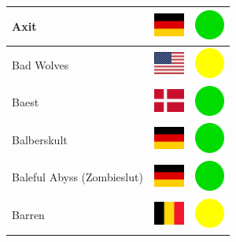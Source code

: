 \documentclass[12pt, a4paper, twoside]{report}
\begin{document}
\begin{center}
\begin{longtable}{|p{5cm}|p{2cm}|p{2cm}|}
 Axit                                                       & \includegraphics[width=1cm]{../img/flags/de} &   \includegraphics[width=1cm]{../likes/y} \\ \hline
 Bad Wolves                                                 & \includegraphics[width=1cm]{../img/flags/us} &   \includegraphics[width=1cm]{../likes/m} \\ \hline
 Baest                                                      & \includegraphics[width=1cm]{../img/flags/dk} &   \includegraphics[width=1cm]{../likes/y} \\ \hline
 Balberskult                                                & \includegraphics[width=1cm]{../img/flags/de} &   \includegraphics[width=1cm]{../likes/y} \\ \hline
 Baleful Abyss (Zombieslut)                                 & \includegraphics[width=1cm]{../img/flags/de} &   \includegraphics[width=1cm]{../likes/y} \\ \hline
 Barren                                                     & \includegraphics[width=1cm]{../img/flags/be} &   \includegraphics[width=1cm]{../likes/m} \\ \hline

\end{longtable}
\end{center}
\end{document}
